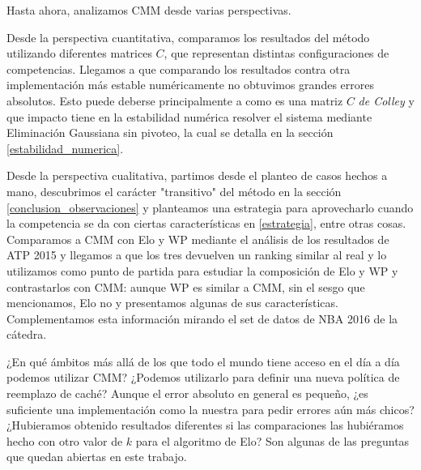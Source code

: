 Hasta ahora, analizamos CMM desde varias perspectivas.

Desde la perspectiva cuantitativa, comparamos los resultados del método utilizando diferentes matrices $C$, que representan distintas configuraciones de competencias. Llegamos a que comparando los resultados contra otra implementación más estable numéricamente no obtuvimos grandes errores absolutos. Esto puede deberse principalmente a como es una matriz $C$ \textit{de Colley} y que impacto tiene en la estabilidad numérica resolver el sistema mediante Eliminación Gaussiana sin pivoteo, la cual se detalla en la sección \ref{estabilidad_numerica}.

Desde la perspectiva cualitativa, partimos desde el planteo de casos hechos a mano, descubrimos el carácter "transitivo" del método en la sección \ref{conclusion_observaciones} y planteamos una estrategia para aprovecharlo cuando la competencia se da con ciertas características en \ref{estrategia}, entre otras cosas. Comparamos a CMM con Elo y WP mediante el análisis de los resultados de ATP 2015 y llegamos a que los tres devuelven un ranking similar al real y lo utilizamos como punto de partida para estudiar la composición de Elo y WP y contrastarlos con CMM: aunque WP es similar a CMM, sin el sesgo que mencionamos, Elo no y presentamos algunas de sus características. Complementamos esta información mirando el set de datos de NBA 2016 de la cátedra.

¿En qué ámbitos más allá de los que todo el mundo tiene acceso en el día a día podemos utilizar CMM? ¿Podemos utilizarlo para definir una nueva política de reemplazo de caché? Aunque el error absoluto en general es pequeño, ¿es suficiente una implementación como la nuestra para pedir errores aún más chicos? ¿Hubieramos obtenido resultados diferentes si las comparaciones las hubiéramos hecho con otro valor de $k$ para el algoritmo de Elo? Son algunas de las preguntas que quedan abiertas en este trabajo.